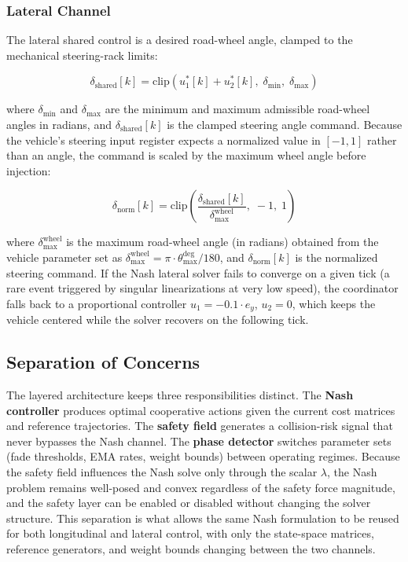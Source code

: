 \documentclass[12pt,a4paper,oneside]{report}
\begin{document}
\subsubsection{Lateral Channel}

The lateral shared control is a desired road-wheel angle, clamped to the mechanical steering-rack limits:

\begin{equation}
\delta_{\mathrm{shared}}[k] = \mathrm{clip}\!\left(u_1^{*}[k] + u_2^{*}[k],\; \delta_{\min},\; \delta_{\max}\right)
\label{eq:nash_ushared_lat}
\end{equation}

where $\delta_{\min}$ and $\delta_{\max}$ are the minimum and maximum admissible road-wheel angles in radians, and $\delta_{\mathrm{shared}}[k]$ is the clamped steering angle command. Because the vehicle's steering input register expects a normalized value in $[-1, 1]$ rather than an angle, the command is scaled by the maximum wheel angle before injection:

\begin{equation}
\delta_{\mathrm{norm}}[k] = \mathrm{clip}\!\left(\frac{\delta_{\mathrm{shared}}[k]}{\delta_{\max}^{\mathrm{wheel}}},\; -1,\; 1\right)
\label{eq:nash_steer_norm}
\end{equation}

where $\delta_{\max}^{\mathrm{wheel}}$ is the maximum road-wheel angle (in radians) obtained from the vehicle parameter set as $\delta_{\max}^{\mathrm{wheel}} = \pi \cdot \theta_{\max}^{\mathrm{deg}} / 180$, and $\delta_{\mathrm{norm}}[k]$ is the normalized steering command. If the Nash lateral solver fails to converge on a given tick (a rare event triggered by singular linearizations at very low speed), the coordinator falls back to a proportional controller $u_1 = -0.1 \cdot e_y$, $u_2 = 0$, which keeps the vehicle centered while the solver recovers on the following tick.

\subsection{Separation of Concerns}
\label{sec:nash_separation}

The layered architecture keeps three responsibilities distinct. The \textbf{Nash controller} produces optimal cooperative actions given the current cost matrices and reference trajectories. The \textbf{safety field} generates a collision-risk signal that never bypasses the Nash channel. The \textbf{phase detector} switches parameter sets (fade thresholds, EMA rates, weight bounds) between operating regimes. Because the safety field influences the Nash solve only through the scalar $\lambda$, the Nash problem remains well-posed and convex regardless of the safety force magnitude, and the safety layer can be enabled or disabled without changing the solver structure. This separation is what allows the same Nash formulation to be reused for both longitudinal and lateral control, with only the state-space matrices, reference generators, and weight bounds changing between the two channels.
\end{document}
